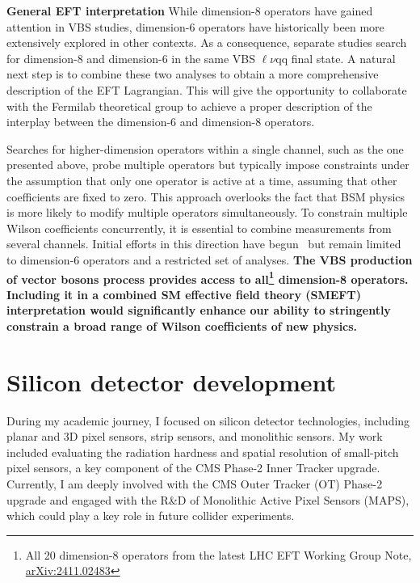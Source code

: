 {\begin{flushleft}
\textbf{General EFT interpretation}
While dimension-8 operators have gained attention in VBS studies, dimension-6 operators have historically been more extensively explored in other contexts. As a consequence, separate studies search for dimension-8 and dimension-6 in the same VBS $\ell\nu$qq final state. A natural next step is to combine these two analyses to obtain a more comprehensive description of the EFT Lagrangian. This will give the opportunity to collaborate with the Fermilab theoretical group to achieve a proper description of the interplay between the dimension-6 and dimension-8 operators.

Searches for higher-dimension operators within a single channel, such as the one presented above, probe multiple operators but typically impose constraints under the assumption that only one operator is active at a time, assuming that other coefficients are fixed to zero. This approach overlooks the fact that BSM physics is more likely to modify multiple operators simultaneously. To constrain multiple Wilson coefficients concurrently, it is essential to combine measurements from several channels. Initial efforts in this direction have begun~\cite{[6]} but remain limited to dimension-6 operators and a restricted set of analyses. {\bf The VBS production of vector bosons process provides access to all\footnote{All 20 dimension-8 operators from the latest LHC EFT Working Group Note, \href{https://arxiv.org/abs/2411.02483v1}{
arXiv:2411.02483}} dimension-8 operators. Including it in a combined SM effective field theory (SMEFT) interpretation would significantly enhance our ability to stringently constrain a broad range of Wilson coefficients of new physics.}



\vskip 10pt
\section{Silicon detector development}
\vskip 5pt
During my academic journey, I focused on silicon detector technologies, including planar and 3D pixel sensors, strip sensors, and monolithic sensors. My work included evaluating the radiation hardness and spatial resolution of small-pitch pixel sensors, a key component of the CMS Phase-2 Inner Tracker upgrade. Currently, I am deeply involved with the CMS Outer Tracker  (OT) Phase-2 upgrade and engaged with the R\&D of Monolithic Active Pixel Sensors (MAPS), which could play a key role in future collider experiments.
\vskip 5pt

\end{flushleft}}
